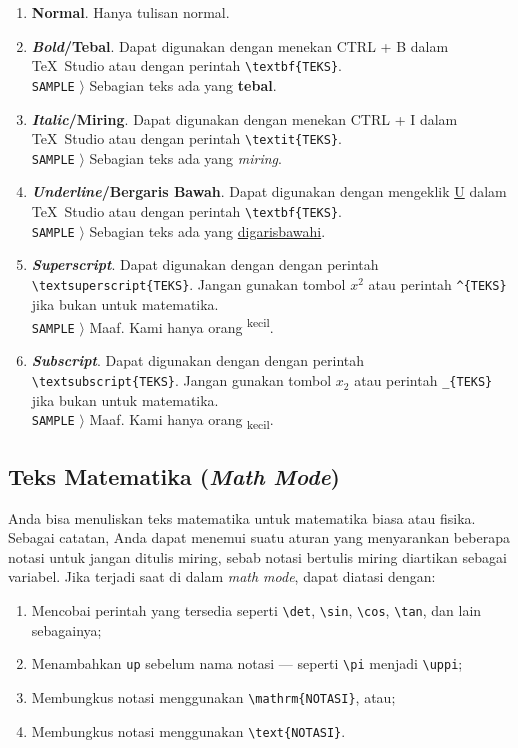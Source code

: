\begin{enumerate}[label=\alph*.]
    \item \textbf{Normal}. Hanya tulisan normal.
    \item \textbf{\textit{Bold}/Tebal}. Dapat digunakan dengan menekan CTRL + B dalam \TeX\ Studio atau dengan perintah \verb|\textbf{TEKS}|. \\
    \texttt{SAMPLE} $\rangle$ Sebagian teks ada yang \textbf{tebal}.
    \item \textbf{\textit{Italic}/Miring}. Dapat digunakan dengan menekan CTRL + I dalam \TeX\ Studio atau dengan perintah \verb|\textit{TEKS}|. \\
    \texttt{SAMPLE} $\rangle$ Sebagian teks ada yang \textit{miring}.
    \item \textbf{\textit{Underline}/Bergaris Bawah}. Dapat digunakan dengan mengeklik \underline{U} dalam \TeX\ Studio atau dengan perintah \verb|\textbf{TEKS}|. \\
    \texttt{SAMPLE} $\rangle$ Sebagian teks ada yang \underline{digarisbawahi}.
    \item \textbf{\textit{Superscript}}. Dapat digunakan dengan dengan perintah \verb|\textsuperscript{TEKS}|. Jangan gunakan tombol $x^2$ atau perintah \verb|^{TEKS}| jika bukan untuk matematika. \\
    \texttt{SAMPLE} $\rangle$ Maaf. Kami hanya orang \textsuperscript{kecil}.
    \item \textbf{\textit{Subscript}}. Dapat digunakan dengan dengan perintah \verb|\textsubscript{TEKS}|. Jangan gunakan tombol $x_2$ atau perintah \verb|_{TEKS}| jika bukan untuk matematika. \\
    \texttt{SAMPLE} $\rangle$ Maaf. Kami hanya orang \textsubscript{kecil}.
\end{enumerate}

\subsection{Teks Matematika (\textit{Math Mode})} \label{subsec:teks-mathmode}

Anda bisa menuliskan teks matematika untuk matematika biasa atau fisika. Sebagai catatan, Anda dapat menemui suatu aturan yang menyarankan beberapa notasi untuk jangan ditulis miring, sebab notasi bertulis miring diartikan sebagai variabel. Jika terjadi saat di dalam \textit{math mode}, dapat diatasi dengan:

\begin{enumerate}[nosep]
    \item Mencobai perintah yang tersedia seperti \verb|\det|, \verb|\sin|, \verb|\cos|, \verb|\tan|, dan lain sebagainya;
    \item Menambahkan \verb|up| sebelum nama notasi --- seperti \verb|\pi| menjadi \verb|\uppi|;
    \item Membungkus notasi menggunakan \verb|\mathrm{NOTASI}|, atau;
    \item Membungkus notasi menggunakan \verb|\text{NOTASI}|.
\end{enumerate}

